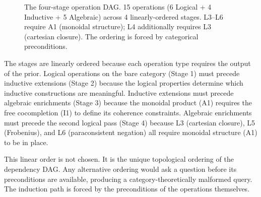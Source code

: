 \documentclass[12pt,a4paper]{article}
\begin{document}
\begin{figure}[htbp]
{
}

\caption{The four-stage operation DAG. 15 operations (6 Logical + 4 Inductive + 5 Algebraic) across 4 linearly-ordered stages. L3--L6 require A1 (monoidal structure); L4 additionally requires L3 (cartesian closure). The ordering is forced by categorical preconditions.}
\label{fig:operation-dag}
\end{figure}

\begin{center}
\end{center}

The stages are linearly ordered because each operation type requires the output of the prior. Logical operations on the bare category (Stage 1) must precede inductive extensions (Stage 2) because the logical properties determine which inductive constructions are meaningful. Inductive extensions must precede algebraic enrichments (Stage 3) because the monoidal product (A1) requires the free cocompletion (I1) to define its coherence constraints. Algebraic enrichments must precede the second logical pass (Stage 4) because L3 (cartesian closure), L5 (Frobenius), and L6 (paraconsistent negation) all require monoidal structure (A1) to be in place.

This linear order is not chosen. It is the unique topological ordering of the dependency DAG. Any alternative ordering would ask a question before its preconditions are available, producing a category-theoretically malformed query. The induction path is forced by the preconditions of the operations themselves.
\end{document}
